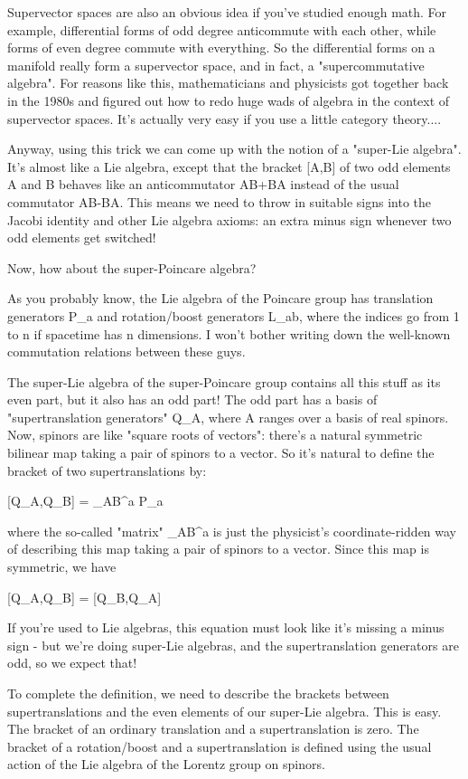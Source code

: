 Supervector spaces are also an obvious idea if you've studied enough 
math.  For example, differential forms of odd degree anticommute with
each other, while forms of even degree commute with everything.  So
the differential forms on a manifold really form a supervector space,
and in fact, a "supercommutative algebra".  For reasons like this, 
mathematicians and physicists got together back in the 1980s and figured
out how to redo huge wads of algebra in the context of supervector spaces.
It's actually very easy if you use a little category theory....

Anyway, using this trick we can come up with the notion of a "super-Lie
algebra".  It's almost like a Lie algebra, except that the bracket [A,B]
of two odd elements A and B behaves like an anticommutator AB+BA instead
of the usual commutator AB-BA.  This means we need to throw in suitable
signs into the Jacobi identity and other Lie algebra axioms: an extra
minus sign whenever two odd elements get switched!

Now, how about the super-Poincare algebra?  

As you probably know, the Lie algebra of the Poincare group has
translation generators P_{a} and rotation/boost generators 
L_{ab}, where
the indices go from 1 to n if spacetime has n dimensions.  I won't bother
writing down the well-known commutation relations between these guys.

The super-Lie algebra of the super-Poincare group contains all this
stuff as its even part, but it also has an odd part!  The odd part has a
basis of "supertranslation generators" Q_{A}, where A
ranges over a basis of real spinors.  Now, spinors are like "square
roots of vectors": there's a natural symmetric bilinear map taking
a pair of spinors to a vector.  So it's natural to define the bracket of
two supertranslations by:

[Q_{A},Q_{B}] = \Gamma _{AB}^{a} P_{a}

where the so-called "\gamma  matrix"
\Gamma _{AB}^{a} is just the physicist's coordinate-ridden
way of describing this map taking a pair of spinors to a vector.  Since
this map is symmetric, we have

[Q_{A},Q_{B}] = [Q_{B},Q_{A}] 

If you're used to Lie algebras, this equation must look like it's
missing a minus sign - but we're doing super-Lie algebras, and
the supertranslation generators are odd, so we expect that!

To complete the definition, we need to describe the brackets between
supertranslations and the even elements of our super-Lie algebra.  This
is easy.  The bracket of an ordinary translation and a supertranslation
is zero.  The bracket of a rotation/boost and a supertranslation is
defined using the usual action of the Lie algebra of the Lorentz group
on spinors.

